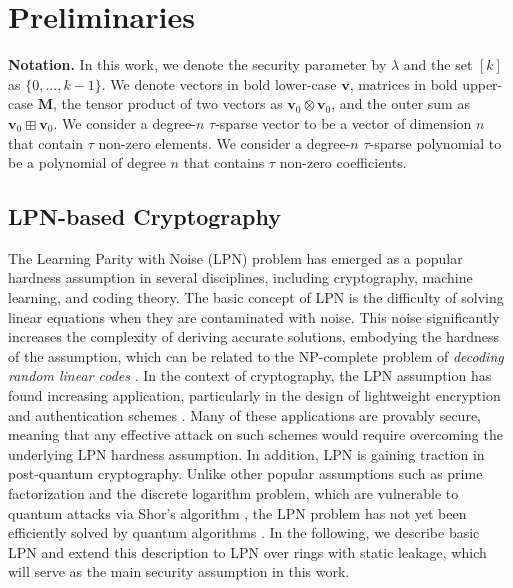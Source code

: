 \chapter{Preliminaries}

\textbf{Notation.} In this work, we denote the security parameter by $\lambda$ and the set $[k]$ as $\{0, ..., k-1\}$. We denote vectors in bold lower-case $\mathbf{v}$, matrices in bold upper-case $\mathbf{M}$, the tensor product of two vectors as $\mathbf{v}_0\otimes\mathbf{v}_0$, and the outer sum as $\mathbf{v}_0\boxplus\mathbf{v}_0$. We consider a degree-$n$ $\tau$-sparse vector to be a vector of dimension $n$ that contain $\tau$ non-zero elements. We consider a degree-$n$ $\tau$-sparse polynomial to be a polynomial of degree $n$ that contains $\tau$ non-zero coefficients.

\section{LPN-based Cryptography}
The Learning Parity with Noise (LPN) problem has emerged as a popular hardness assumption in several disciplines, including cryptography, machine learning, and coding theory. The basic concept of LPN is the difficulty of solving linear equations when they are contaminated with noise. This noise significantly increases the complexity of deriving accurate solutions, embodying the hardness of the assumption, which can be related to the NP-complete problem of \textit{decoding random linear codes} \cite{yu2016pseudorandom}. In the context of cryptography, the LPN assumption has found increasing application, particularly in the design of lightweight encryption and authentication schemes \cite{pietrzak2012cryptography}. Many of these applications are provably secure, meaning that any effective attack on such schemes would require overcoming the underlying LPN hardness assumption. In addition, LPN is gaining traction in post-quantum cryptography. Unlike other popular assumptions such as prime factorization and the discrete logarithm problem, which are vulnerable to quantum attacks via Shor's algorithm \cite{shor1999polynomial}, the LPN problem has not yet been efficiently solved by quantum algorithms \cite{zhao2018hardness}. 
In the following, we describe basic LPN and extend this description to LPN over rings with static leakage, which will serve as the main security assumption in this work.

